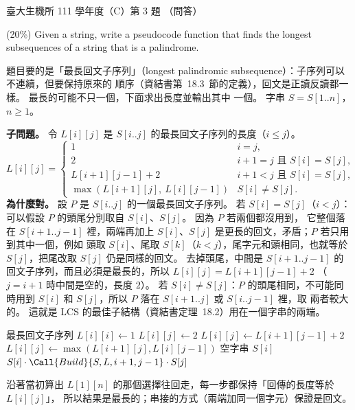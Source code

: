 \begin{pastexam}[label={px:ntu-111-bime-ds-03}]{臺大生機所 111 學年度（C）第 3 題}
（問答）

(20\%) Given a string, write a pseudocode function that finds the longest subsequences of a string
that is a palindrome.
\end{pastexam}

\begin{pastsoln}
題目要的是「最長回文子序列」（longest palindromic subsequence）：子序列可以不連續，但要保持原來的
順序（資結書第~18.3~節的定義），回文是正讀反讀都一樣。 最長的可能不只一個，下面求出長度並輸出其中
一個。 字串 $S = S[1..n]$，$n \ge 1$。

\textbf{子問題。} 令 $L[i][j]$ 是 $S[i..j]$ 的最長回文子序列的長度（$i \le j$）。
\[
L[i][j] =
\begin{cases}
1 & i = j, \\
2 & i + 1 = j \text{ 且 } S[i] = S[j], \\
L[i+1][j-1] + 2 & i + 1 < j \text{ 且 } S[i] = S[j], \\
\max(L[i+1][j],\ L[i][j-1]) & S[i] \ne S[j].
\end{cases}
\]
\textbf{為什麼對。} 設 $P$ 是 $S[i..j]$ 的一個最長回文子序列。 若 $S[i] = S[j]$（$i < j$）：可以假設 $P$ 的頭尾分別取自 $S[i]$、$S[j]$。 因為 $P$ 若兩個都沒用到，
它整個落在 $S[i+1..j-1]$ 裡，兩端再加上 $S[i]$、$S[j]$ 是更長的回文，矛盾；$P$ 若只用到其中一個，例如
頭取 $S[i]$、尾取 $S[k]$（$k < j$），尾字元和頭相同，也就等於 $S[j]$，把尾改取 $S[j]$ 仍是同樣的回文。
去掉頭尾，中間是 $S[i+1..j-1]$ 的回文子序列，而且必須是最長的，所以 $L[i][j] = L[i+1][j-1] + 2$
（$j = i + 1$ 時中間是空的，長度 $2$）。 若 $S[i] \ne
S[j]$：$P$ 的頭尾相同，不可能同時用到 $S[i]$ 和 $S[j]$，所以 $P$ 落在 $S[i+1..j]$ 或 $S[i..j-1]$ 裡，取
兩者較大的。 這就是 LCS 的最佳子結構（資結書定理~18.2）用在一個字串的兩端。

\begin{pseudo}{最長回文子序列}
     
        \State $L[i][i] \gets 1$
                    \State $L[i][j] \gets 2$
                \Else
                    \State $L[i][j] \gets L[i+1][j-1] + 2$
                \EndIf
            \Else
                \State $L[i][j] \gets \max(L[i+1][j], L[i][j-1])$
            \EndIf
        \EndFor
    \EndFor
    \State \Return {}
\EndFunction
\Statex
{} 
        \State \Return 空字串
        \State \Return $S[i]$
        \State \Return $S[i] \cdot \Call{Build}{S, L, i + 1, j - 1} \cdot S[j]$ 
        \State \Return {}
    \Else
        \State \Return {}
    \EndIf
\EndFunction
\end{pseudo}
 沿著當初算出 $L[1][n]$ 的那個選擇往回走，每一步都保持「回傳的長度等於 $L[i][j]$」，
所以結果是最長的；串接的方式（兩端加同一個字元）保證是回文。


\end{pastsoln}
